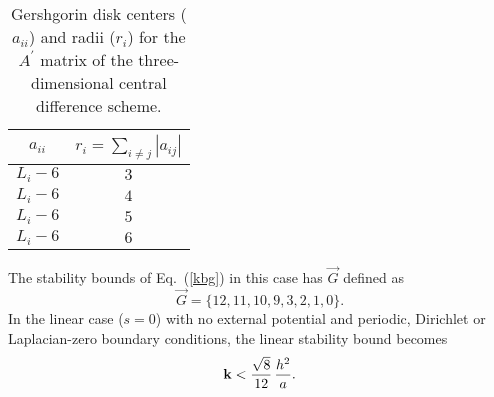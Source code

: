 \documentclass{article}
\begin{document}
\begin{table}[htbp] 
\centering 
\caption{Gershgorin disk centers ($a_{ii}$) and radii ($r_i$) for the $A^{\prime}$ matrix of the three-dimensional central difference scheme.}
\begin{tabular}{|c|c|} \hline
$a_{ii}$   & $r_i = \sum_{i\ne j} |a_{ij}|$ \\ \hline
$L_i - 6$  & $3$ \\
$L_i - 6$  & $4$ \\
$L_i - 6$  & $5$ \\
$L_i - 6$  & $6$ \\
\hline
\end{tabular}
\label{t:3dcdgd}
\end{table}
The stability bounds of Eq.~(\ref{kbg}) in this case has $\vec G$ defined as
\begin{equation}
\label{G3DCD}
\vec G = \{12,11,10,9,3,2,1,0\}.
\end{equation}
In the linear case ($s=0$) with no external potential and periodic, Dirichlet or Laplacian-zero boundary conditions, the linear stability bound becomes
\begin{equation}
\label{kbound3dcdlin}
{\bf k} < \frac{\sqrt{8}}{12}\,\frac{h^2}{a}.
\end{equation}
\end{document}
